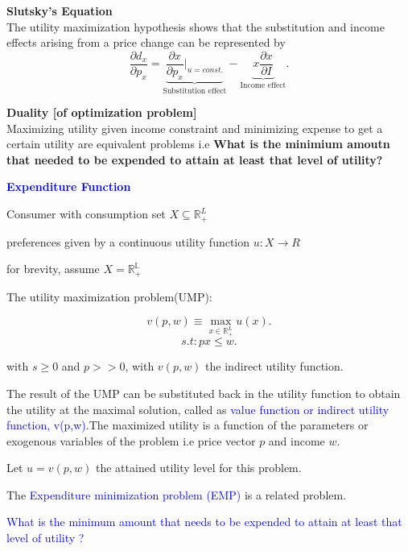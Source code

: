 \documentclass{tufte-handout}
\begin{document}



\clearpage

\textbf{\large{\centering Slutsky's Equation}} \\ 
The utility maximization hypothesis shows that the substitution and income effects arising from a price change can be represented by
\[
		\frac{\partial d_x}{\partial p_x} =
\underbrace{\frac{\partial x}{\partial p_x} \Big|_{u = const.}}_{\text{Substitution effect}} 
- \underbrace{x \frac{\partial x}{\partial I}}_{\text{Income effect}}
.\] 


\clearpage

\textbf{\large{Duality [of optimization problem] }}\\
Maximizing utility given income constraint and minimizing expense to get a certain utility are equivalent problems i.e \textbf{ What is the minimium amoutn that needed to be expended to attain at least that level of utility?}

\vspace{0.5cm}

\textcolor{blue}{\textbf{Expenditure Function}}


\textbullet  Consumer with consumption set $ X  \subseteq   \mathbb{R}^L_+$

\textbullet  preferences given by a continuous utility function 
$u: X \to R$

\textbullet  for brevity, assume $X = \mathbb{R_+ ^L}$

\textbullet   The utility maximization problem(UMP):

\[v(p,w) \equiv \max_{x \in \mathbb{R}_+^L} u(x) .\]
\[ s.t : px \leq w .\]

with $s \geq 0$ and  $p >> 0$, with  $v(p,w)$ the indirect utility function.

\textbullet  The result of the UMP can be substituted back in the utility function to obtain the utility at the maximal solution, called as \textcolor{blue}{value function or indirect utility function, v(p,w)}.The maximized utility is a function of the parameters or exogenous variables of the problem i.e price vector $p$ and income $w$. 


\textbullet  Let $ u =v(p,w)$ the attained utility level for this problem.


\textbullet  The \textcolor{blue}{Expenditure minimization problem (EMP)} is a related problem.


\textbullet   \textcolor{blue}{ What is the minimum amount that needs to be expended to attain at least that level of utility ?}
\end{document}
